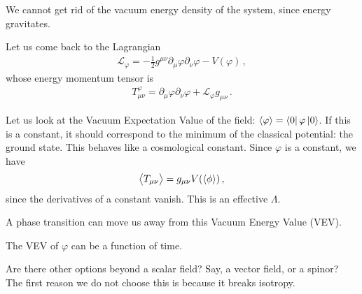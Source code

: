 \documentclass[main.tex]{subfiles}
\begin{document}
We cannot get rid of the vacuum energy density of the system, since energy gravitates. 

Let us come back to the Lagrangian 
%
\begin{align}
\mathscr{L}_{\varphi } = - \frac{1}{2} g^{\mu \nu } \partial_{\mu } \varphi \partial_{\nu } \varphi - V(\varphi )
\,,
\end{align}
%
whose energy momentum tensor is 
%
\begin{align}
T^{\varphi }_{\mu \nu } = \partial_{\mu } \varphi \partial_{\nu } \varphi + \mathscr{L}_{\varphi } g_{\mu \nu }
\,.
\end{align}

Let us look at the Vacuum Expectation Value of the field: \(\expval{\varphi } = \bra{0} \varphi \ket{0}\). If this is a constant, it should correspond to the minimum of the classical potential: the ground state. 
This behaves like a cosmological constant. 
Since \(\varphi \) is a constant, we have 
%
\begin{align}
\expval{T_{\mu \nu }} = g_{\mu \nu } V(\expval{\phi })
\,,
\end{align}
%
since the derivatives of a constant vanish. 
This is an effective \(\Lambda \). 

A phase transition can move us away from this Vacuum Energy Value (VEV).

The VEV of \(\varphi \) can be a function of time. 

Are there other options beyond a scalar field? Say, a vector field, or a spinor?
The first reason we do not choose this is because it breaks isotropy.
\end{document}
